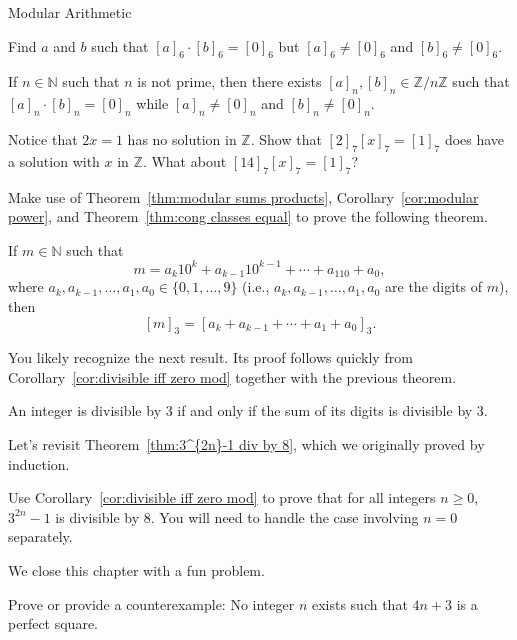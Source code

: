 \begin{section}{Modular Arithmetic}
\begin{problem}
Find $a$ and $b$ such that $[a]_6\cdot[b]_6 = [0]_6$ but $[a]_6 \neq [0]_6$ and $[b]_6 \neq [0]_6$. %
\end{problem}

\begin{theorem}
If $n\in \mathbb{N}$ such that $n$ is not prime, then there exists $[a]_n, [b]_n \in \mathbb{Z}/n\mathbb{Z}$ such that $[a]_n\cdot[b]_n = [0]_n$ while $[a]_n \neq [0]_n$ and $[b]_n \neq [0]_n$.
\end{theorem}

\begin{problem}
Notice that $2x = 1$ has no solution in $\mathbb{Z}$. Show that $[2]_7[x]_7 = [1]_7$ does have a solution with $x$ in $\mathbb{Z}$. What about $[14]_7[x]_7 = [1]_7$?
\end{problem}

Make use of Theorem~\ref{thm:modular sums products}, Corollary~\ref{cor:modular power}, and Theorem~\ref{thm:cong classes equal} to prove the following theorem.

\begin{theorem}
If $m\in \mathbb{N}$ such that
\[
m=a_k10^k + a_{k-1}10^{k-1} + \cdots + a_110 + a_0,
\]
where $a_k, a_{k-1}, \ldots, a_1, a_0\in \{0,1,\ldots, 9\}$ (i.e., $a_k, a_{k-1}, \ldots, a_1, a_0$ are the digits of $m$), then
\[
[m]_3 =  [a_k + a_{k-1} + \cdots + a_1 + a_0]_3.
\]
\end{theorem}

You likely recognize the next result. Its proof follows quickly from Corollary~\ref{cor:divisible iff zero mod} together with the previous theorem.

\begin{theorem}
An integer is divisible by $3$ if and only if the sum of its digits is divisible by $3$.
\end{theorem}

Let's revisit Theorem~\ref{thm:3^{2n}-1 div by 8}, which we originally proved by induction.

\begin{problem}
Use Corollary~\ref{cor:divisible iff zero mod} to prove that for all integers $n \ge 0$, $3^{2n}-1$ is divisible by $8$. You will need to handle the case involving $n=0$ separately.
\end{problem}

We close this chapter with a fun problem.

\begin{problem}
Prove or provide a counterexample:  No integer $n$ exists such that $4n+3$ is a perfect square.
\end{problem}

\end{section}
